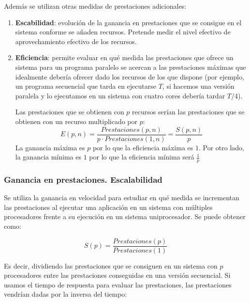 \documentclass[10pt,a4paper,spanish]{report}
\begin{document}
Además se utilizan otras medidas de prestaciones adicionales:
\begin{enumerate}[\color{azul}{\bf $\heartsuit$}]
    \item \textcolor[rgb]{0.2,0.4,0.8}{\textbf{Escabilidad}}: evolución de la ganancia en prestaciones que se consigue en el sistema conforme se añaden recursos. Pretende medir el nivel efectivo de aprovechamiento efectivo de los recursos. %
    \item \textcolor[rgb]{0.2,0.4,0.8}{\textbf{Eficiencia}}: permite evaluar en qué medida las prestaciones que ofrece un sistema para un programa paralelo se acercan a las prestaciones máximas que idealmente debería ofrecer dado los recursos de los que dispone (por ejemplo, un programa secuencial que tarda en ejecutarse $T$, si hacemos una versión paralela y lo ejecutamos en un sistema con cuatro cores debería tardar $T/4$).

    Las prestaciones que se obtienen con $p$ recursos serían las prestaciones que se obtienen con un recurso multiplicado por $p$:
    \begin{displaymath}
    E(p,n) = \frac{Prestaciones(p,n)}{p\cdot Prestaciones(1,n)} = \frac{S(p,n)}{p}
    \end{displaymath}
    La ganancia máxima es $p$ por lo que la eficiencia máxima es $1$. Por otro lado, la ganancia mínima es $1$ por lo que la eficiencia mínima será $\frac{1}{p}$
\end{enumerate}

\textcolor[rgb]{0.2,0.4,0.8}{\subsubsection{Ganancia en prestaciones. Escalabilidad}}
Se utiliza la ganancia en velocidad para estudiar en qué medida se incrementan las prestaciones al ejecutar una aplicación en un sistema con múltiples procesadores frente a su ejecución en un sistema uniprocesador. Se puede obtener como:


\begin{displaymath}
S(p) = \frac{Prestaciones(p)}{Prestaciones(1)}
\end{displaymath}

Es decir, dividiendo las prestaciones que se consiguen en un sistema con $p$ procesadores entre las prestaciones conseguidas en una versión secuencial. Si usamos el tiempo de respuesta para evaluar las prestaciones, las prestaciones vendrían dadas por la inversa del tiempo:
\end{document}
